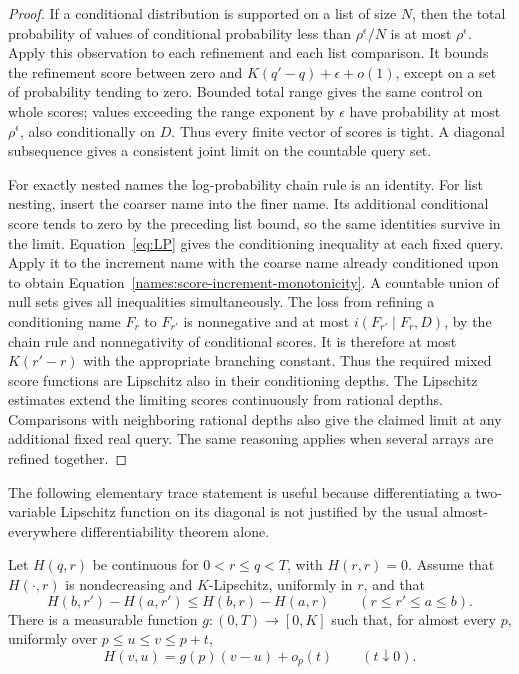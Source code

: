 \begin{proof}
If a conditional distribution is supported on a list of size $N$, then
the total probability of values of conditional probability less than
$\rho^\epsilon/N$ is at most $\rho^\epsilon$.  Apply this observation to
each refinement and each list comparison.  It bounds the refinement
score between zero and $K(q'-q)+\epsilon+o(1)$, except on a set of
probability tending to zero.  Bounded total range gives the same
control on whole scores; values exceeding the range exponent by
$\epsilon$ have probability at most $\rho^\epsilon$, also conditionally
on $D$.  Thus every finite vector of scores is tight.  A diagonal
subsequence gives a consistent joint limit on the countable query set.

For exactly nested names the log-probability chain rule is an identity.
For list nesting, insert the coarser name into the finer name.  Its
additional conditional score tends to zero by the preceding list bound,
so the same identities survive in the limit.  Equation~\eqref{eq:LP}
gives the conditioning inequality at each fixed query.  Apply it to the
increment name with the coarse name already conditioned upon to obtain
Equation~\eqref{names:score-increment-monotonicity}.  A countable union
of null sets gives all inequalities simultaneously.  The loss from
refining a conditioning name $F_r$ to $F_{r'}$ is nonnegative and at
most $i(F_{r'}\mid F_r,D)$, by the chain rule and nonnegativity of
conditional scores.  It is therefore at most $K(r'-r)$ with the
appropriate branching constant.  Thus the required mixed score
functions are Lipschitz also in their conditioning depths.  The Lipschitz
estimates extend the limiting scores continuously from rational depths.
Comparisons with neighboring rational depths also give the claimed
limit at any additional fixed real query.  The same reasoning applies
when several arrays are refined together.
\end{proof}

The following elementary trace statement is useful because differentiating
a two-variable Lipschitz function on its diagonal is not justified by
the usual almost-everywhere differentiability theorem alone.

\begin{lemma}
\label{names:score-trace}
Let $H(q,r)$ be continuous for $0<r\le q<T$, with $H(r,r)=0$.
Assume that $H(\cdot,r)$ is nondecreasing and $K$-Lipschitz, uniformly in
$r$, and that
\[
 H(b,r')-H(a,r')\le H(b,r)-H(a,r)
 \qquad(r\le r'\le a\le b).
\]
There is a measurable function $g:(0,T)\to[0,K]$ such that, for almost
every $p$, uniformly over $p\le u\le v\le p+t$,
\begin{equation}
 H(v,u)=g(p)(v-u)+o_p(t)
 \qquad(t\downarrow0).
 \label{names:score-triangular-trace}
\end{equation}
\end{lemma}

